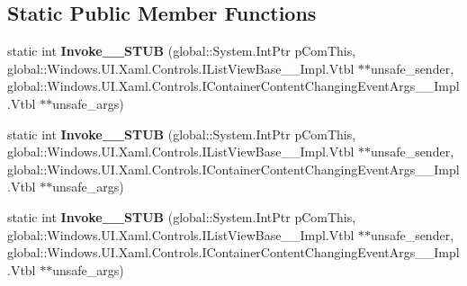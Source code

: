 \subsection*{Static Public Member Functions}
\begin{DoxyCompactItemize}
\item 
\mbox{\label{struct_windows_1_1_foundation_1_1_typed_event_handler___a___windows___u_i___xaml___controls___libdb9ee787e603cdc08b3e175469ff6f2_aa3d73018409978b40173eabb629a9497}} 
static int {\bfseries Invoke\+\_\+\+\_\+\+S\+T\+UB} (global\+::\+System.\+Int\+Ptr p\+Com\+This, global\+::\+Windows.\+U\+I.\+Xaml.\+Controls.\+I\+List\+View\+Base\+\_\+\+\_\+\+Impl.\+Vtbl $\ast$$\ast$unsafe\+\_\+sender, global\+::\+Windows.\+U\+I.\+Xaml.\+Controls.\+I\+Container\+Content\+Changing\+Event\+Args\+\_\+\+\_\+\+Impl.\+Vtbl $\ast$$\ast$unsafe\+\_\+args)
\item 
\mbox{\label{struct_windows_1_1_foundation_1_1_typed_event_handler___a___windows___u_i___xaml___controls___libdb9ee787e603cdc08b3e175469ff6f2_aa3d73018409978b40173eabb629a9497}} 
static int {\bfseries Invoke\+\_\+\+\_\+\+S\+T\+UB} (global\+::\+System.\+Int\+Ptr p\+Com\+This, global\+::\+Windows.\+U\+I.\+Xaml.\+Controls.\+I\+List\+View\+Base\+\_\+\+\_\+\+Impl.\+Vtbl $\ast$$\ast$unsafe\+\_\+sender, global\+::\+Windows.\+U\+I.\+Xaml.\+Controls.\+I\+Container\+Content\+Changing\+Event\+Args\+\_\+\+\_\+\+Impl.\+Vtbl $\ast$$\ast$unsafe\+\_\+args)
\item 
\mbox{\label{struct_windows_1_1_foundation_1_1_typed_event_handler___a___windows___u_i___xaml___controls___libdb9ee787e603cdc08b3e175469ff6f2_aa3d73018409978b40173eabb629a9497}} 
static int {\bfseries Invoke\+\_\+\+\_\+\+S\+T\+UB} (global\+::\+System.\+Int\+Ptr p\+Com\+This, global\+::\+Windows.\+U\+I.\+Xaml.\+Controls.\+I\+List\+View\+Base\+\_\+\+\_\+\+Impl.\+Vtbl $\ast$$\ast$unsafe\+\_\+sender, global\+::\+Windows.\+U\+I.\+Xaml.\+Controls.\+I\+Container\+Content\+Changing\+Event\+Args\+\_\+\+\_\+\+Impl.\+Vtbl $\ast$$\ast$unsafe\+\_\+args)
\item 

\end{DoxyCompactItemize}
